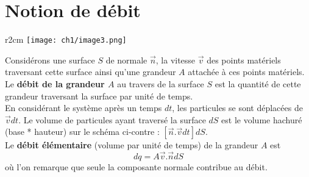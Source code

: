 \section{Notion de débit}
\begin{wrapfigure}[12]{r}{2cm}
\texttt{[image: ch1/image3.png]}
\end{wrapfigure}
Considérons une surface $S$ de normale $\vec n$, la vitesse $\vec{v}$ des points matériels traversant cette
surface ainsi qu'une grandeur $A$ attachée à ces points matériels.\\
Le \textbf{débit de la grandeur $A$} au travers de la surface $S$ est la quantité de cette grandeur 
traversant la surface par unité de temps.\\

En considérant le système après un temps $dt$, les particules se sont déplacées de $\vec{v}dt$. Le
volume de particules ayant traversé la surface $dS$ est le volume hachuré (base * hauteur) sur le
schéma ci-contre : $[\vec{n}.\vec{v}dt]dS$.\\
Le \textbf{débit élémentaire} (volume par unité de temps) de la grandeur $A$ est 
\begin{equation}
dq = A \vec{v}.\vec{n}dS
\end{equation}
où l'on remarque que seule la composante normale contribue au débit.
